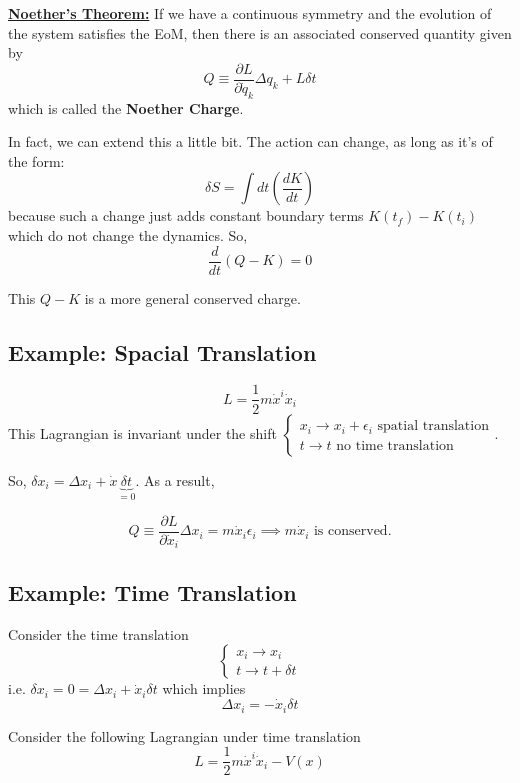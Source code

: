 \documentclass[11pt]{article}
\begin{document}
\vskip 0.5cm
\begin{bluebox}
  \underline{\textbf{Noether's Theorem:}}
  If we have a continuous symmetry and the evolution of the system satisfies the EoM, then there is an associated conserved quantity given by 
  \[ Q \equiv \frac{\partial L}{\partial \dot{q}_k} \Delta q_{k} + L \delta t  \]
  which is called the \textbf{Noether Charge}.
\end{bluebox}

\vskip 0.5cm 
In fact, we can extend this a little bit. The action can change, as long as it's of the form:
\[ \delta S = \int dt \left( \frac{dK}{dt} \right) \]
because such a change just adds constant boundary terms $K(t_f) - K(t_i)$ which do not change the dynamics. So,
\[ \frac{d}{dt} \left( Q - K \right) = 0 \]

\vskip 0.5cm
This $Q - K$ is a more general conserved charge.

\vskip 0.5cm
\subsection{Example: Spacial Translation}
\[ L = \frac{1}{2} m\dot{x}^i \dot{x}_i \]
This Lagrangian is invariant under the shift $\begin{cases}
  x_i \rightarrow x_i + \epsilon_i \text{  spatial translation} \\
  t \rightarrow t \text{ no time translation}
\end{cases}$. 

So, $\delta x_i = \Delta x_i + \dot{x} \underbrace{\delta t}_{=0}$. As a result,

\[ Q \equiv \frac{\partial L}{\partial \dot{x}_i} \Delta x_i = m\dot{x}_i \epsilon_i \implies m\dot{x}_i \text{ is conserved.}\]

\vskip 0.5cm
\subsection{Example: Time Translation}
Consider the time translation 
\[ \begin{cases}
  x_i \rightarrow x_i \\
  t \rightarrow t + \delta t
\end{cases}  \]
i.e. $\delta x_i = 0 = \Delta x_i + \dot{x}_i \delta t$ which implies 
\[ \Delta x_i = -\dot{x}_i \delta t \]

\vskip 0.5cm
Consider the following Lagrangian under time translation
\[ L = \frac{1}{2}m\dot{x}^i \dot{x}_i - V(x) \]
\end{document}
